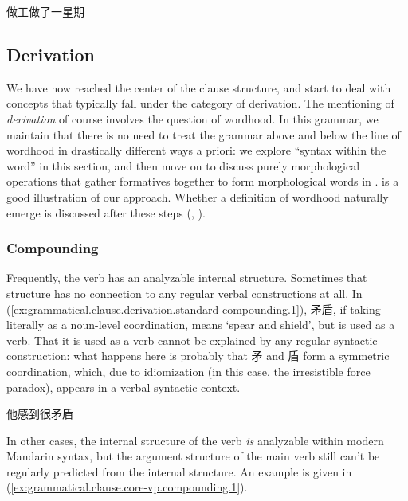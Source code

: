 \documentclass[UTF8, a4paper, oneside, scheme=plain, 12pt]{ctexrep}
\newcommand*{\term}[1]{\emph{#1}}
\newcommand{\translate}[1]{`#1'}
\begin{document}
\begin{exe}
    \ex 做工做了一星期
\end{exe}

\subsection{Derivation}\label{sec:grammatical.clause.core-vp.derivation}

We have now reached the center of the clause structure,
and start to deal with concepts that typically fall under the category of derivation.
The mentioning of \term{derivation} of course involves the question of wordhood.
In this grammar, we maintain that there is no need to treat the grammar above and below the line of wordhood
in drastically different ways a priori: we explore ``syntax within the word'' in this section,
and then move on to discuss purely morphological operations that gather formatives together to form morphological words in .
 is a good illustration of our approach.
Whether a definition of wordhood naturally emerge is discussed after these steps
(, ).

\subsubsection{Compounding}\label{sec:grammatical.clause.core-vp.derivation.compounding}

Frequently, the verb has an analyzable internal structure.
Sometimes that structure has no connection to any regular verbal constructions at all.
In (\ref{ex:grammatical.clause.derivation.standard-compounding.1}),
矛盾, if taking literally as a noun-level coordination, means \translate{spear and shield},
but is used as a verb.
That it is used as a verb cannot be explained by any regular syntactic construction:
what happens here is probably that 矛 and 盾 form a symmetric coordination,
which, due to idiomization (in this case, the irresistible force paradox),
appears in a verbal syntactic context.

\begin{exe}
    \ex\label{ex:grammatical.clause.derivation.standard-compounding.1} 他感到很矛盾
\end{exe}

In other cases, the internal structure of the verb \emph{is} analyzable within modern Mandarin syntax,
but the argument structure of the main verb still can't
be regularly predicted from the internal structure.
An example is given in (\ref{ex:grammatical.clause.core-vp.compounding.1}).
\end{document}
